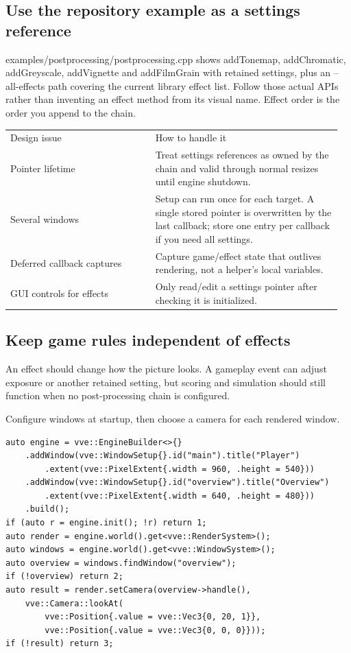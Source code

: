\documentclass[11pt,a4paper]{article}
\begin{document}
\subsection*{Use the repository example as a settings reference}
examples/postprocessing/postprocessing.cpp shows addTonemap, addChromatic, addGreyscale, addVignette and addFilmGrain with retained settings, plus an --all-effects path covering the current library effect list. Follow those actual APIs rather than inventing an effect method from its visual name. Effect order is the order you append to the chain.

{\small
\begin{longtable}{@{}p{0.42\linewidth}p{0.54\linewidth}@{}}
Design issue & How to handle it \\
Pointer lifetime & Treat settings references as owned by the chain and valid through normal resizes until engine shutdown. \\
Several windows & Setup can run once for each target. A single stored pointer is overwritten by the last callback; store one entry per callback if you need all settings. \\
Deferred callback captures & Capture game/effect state that outlives rendering, not a helper's local variables. \\
GUI controls for effects & Only read/edit a settings pointer after checking it is initialized. \\
\end{longtable}
}

\subsection*{Keep game rules independent of effects}
An effect should change how the picture looks. A gameplay event can adjust exposure or another retained setting, but scoring and simulation should still function when no post-processing chain is configured.

\label{core-70}
Configure windows at startup, then choose a camera for each rendered window.

\begin{lstlisting}[language={}]
auto engine = vve::EngineBuilder<>{}
    .addWindow(vve::WindowSetup{}.id("main").title("Player")
        .extent(vve::PixelExtent{.width = 960, .height = 540}))
    .addWindow(vve::WindowSetup{}.id("overview").title("Overview")
        .extent(vve::PixelExtent{.width = 640, .height = 480}))
    .build();
if (auto r = engine.init(); !r) return 1;
auto render = engine.world().get<vve::RenderSystem>();
auto windows = engine.world().get<vve::WindowSystem>();
auto overview = windows.findWindow("overview");
if (!overview) return 2;
auto result = render.setCamera(overview->handle(),
    vve::Camera::lookAt(
        vve::Position{.value = vve::Vec3{0, 20, 1}},
        vve::Position{.value = vve::Vec3{0, 0, 0}}));
if (!result) return 3;
\end{lstlisting}
\end{document}
